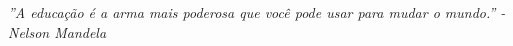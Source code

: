 \begin{epigrafe}
    \vspace*{\fill}
    \begin{flushright}
        \textit{''A educação é a arma mais poderosa que você pode usar para mudar o mundo.'' - Nelson Mandela}
    \end{flushright}
\end{epigrafe}